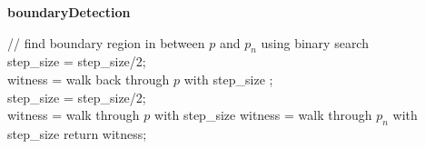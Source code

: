 \begin{algorithm} [htbp]

 {\bf boundaryDetection}\\
 \BlankLine

	{
		{
			// find boundary region in between $p$ and $p_n$ using binary search \\

			step\_size = step\_size/2;\\
			witness = walk back through $p$ with step\_size ;\\

			{
				step\_size = step\_size/2; 	\\
				{	witness = walk through $p$ with step\_size }
				{	witness = walk through $p_n$ with step\_size }
			}
		}
	}
	return witness;\\

 \caption{ boundaryDetection
\label{alg:boundaryDetection}}
\end{algorithm}


